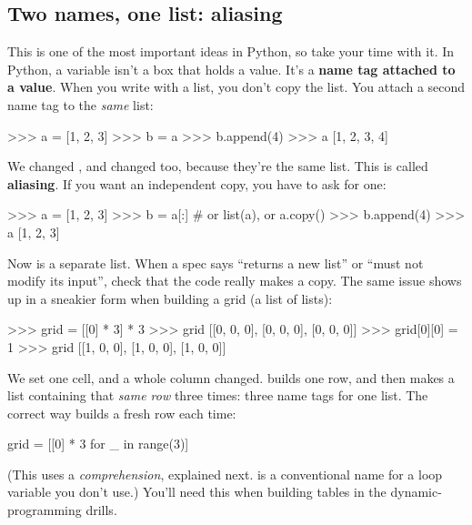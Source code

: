 \documentclass[10pt,a4paper]{article}
\begin{document}
\subsection{Two names, one list: aliasing}
This is one of the most important ideas in Python, so take your time with it.
In Python, a variable isn’t a box that holds a value. It’s a \textbf{name tag attached to a value}. When you write  with a list, you don’t copy the list. You attach a second name tag to the \emph{same} list:
\begin{txtcode}
>>> a = [1, 2, 3]
>>> b = a
>>> b.append(4)
>>> a
[1, 2, 3, 4]
\end{txtcode}
We changed , and  changed too, because they’re the same list. This is called \textbf{aliasing}. If you want an independent copy, you have to ask for one:
\begin{txtcode}
>>> a = [1, 2, 3]
>>> b = a[:]          # or list(a), or a.copy()
>>> b.append(4)
>>> a
[1, 2, 3]
\end{txtcode}
Now  is a separate list. When a spec says “returns a new list” or “must not modify its input”, check that the code really makes a copy.
The same issue shows up in a sneakier form when building a grid (a list of lists):
\begin{txtcode}
>>> grid = [[0] * 3] * 3
>>> grid
[[0, 0, 0], [0, 0, 0], [0, 0, 0]]
>>> grid[0][0] = 1
>>> grid
[[1, 0, 0], [1, 0, 0], [1, 0, 0]]
\end{txtcode}
We set one cell, and a whole column changed.  builds one row, and  then makes a list containing that \emph{same row} three times: three name tags for one list. The correct way builds a fresh row each time:
\begin{pycode}
grid = [[0] * 3 for _ in range(3)]
\end{pycode}
(This uses a \emph{comprehension}, explained next. \code{\_} is a conventional name for a loop variable you don’t use.) You’ll need this when building tables in the dynamic-programming drills.
\end{document}
